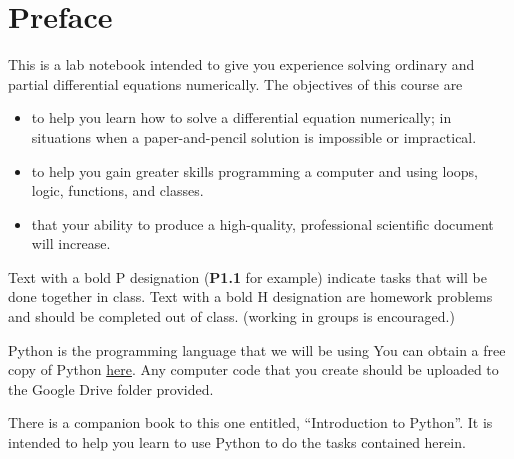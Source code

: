 \chapter*{Preface}

This is a lab notebook intended to give you experience solving
ordinary and partial differential equations numerically.  The
objectives of this course are 
\begin{itemize}
\item to help you learn how to solve a differential equation
  numerically; in situations when a paper-and-pencil solution is
  impossible or impractical.
\item to help you gain greater skills programming a computer and using
  loops, logic, functions, and classes.
\item that your ability to produce a high-quality, professional
  scientific document will increase.
\end{itemize}

Text with a bold P designation (\textbf{P1.1} for example) indicate tasks
that will be done together in class.  Text with a bold H designation
are homework problems and should be completed out of class. (working
in groups is encouraged.) 

Python is the programming language that we will be using You can
obtain a free copy of Python
\href{https://store.enthought.com/downloads/}{here}.  Any computer
code that you create should be uploaded to the Google Drive folder
provided.

There is a companion book to this one entitled, ``Introduction to
Python''.  It is intended to help you learn to use Python to do the
tasks contained herein.  